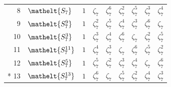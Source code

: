 \documentclass[10pt,a4paper]{article}
\numberwithin{equation}{section}
\newcommand{\eltfont}[1]{{\let\sigma\eltsigma\mathelt{#1}}}
\newcommand{\cls}[1]{\eltfont{#1}}
\newcommand{\rootunity}[1]{\zeta_{#1}}
\begin{document}
{\begin{longtable}{@{}rllllllll@{}}
8 & $\cls{S_{7}}$ & $1$ & $\rootunity{7}$ & $\rootunity{7}^{6}$ & $\rootunity{7}^{2}$ & $\rootunity{7}^{5}$ & $\rootunity{7}^{3}$ & $\rootunity{7}^{4}$\\
9 & $\cls{S_{7}^{9}}$ & $1$ & $\rootunity{7}^{2}$ & $\rootunity{7}^{5}$ & $\rootunity{7}^{4}$ & $\rootunity{7}^{3}$ & $\rootunity{7}^{6}$ & $\rootunity{7}$\\
10 & $\cls{S_{7}^{3}}$ & $1$ & $\rootunity{7}^{3}$ & $\rootunity{7}^{4}$ & $\rootunity{7}^{6}$ & $\rootunity{7}$ & $\rootunity{7}^{2}$ & $\rootunity{7}^{5}$\\
11 & $\cls{S_{7}^{11}}$ & $1$ & $\rootunity{7}^{4}$ & $\rootunity{7}^{3}$ & $\rootunity{7}$ & $\rootunity{7}^{6}$ & $\rootunity{7}^{5}$ & $\rootunity{7}^{2}$\\
12 & $\cls{S_{7}^{5}}$ & $1$ & $\rootunity{7}^{5}$ & $\rootunity{7}^{2}$ & $\rootunity{7}^{3}$ & $\rootunity{7}^{4}$ & $\rootunity{7}$ & $\rootunity{7}^{6}$\\*
13 & $\cls{S_{7}^{13}}$ & $1$ & $\rootunity{7}^{6}$ & $\rootunity{7}$ & $\rootunity{7}^{5}$ & $\rootunity{7}^{2}$ & $\rootunity{7}^{4}$ & $\rootunity{7}^{3}$\\
\bottomrule\end{longtable}}
\end{document}
